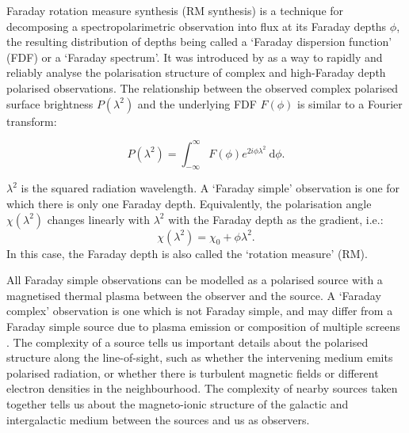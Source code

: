   Faraday rotation measure synthesis (RM synthesis) is a technique for decomposing a spectropolarimetric observation into flux at its Faraday depths $\phi$, the resulting distribution of depths being called a `Faraday dispersion function' (FDF) or a `Faraday spectrum'. It was introduced by \citet{brentjens_faraday_2005} as a way to rapidly and reliably analyse the polarisation structure of complex and high-Faraday depth polarised observations. The relationship between the observed complex polarised surface brightness $P(\lambda^2)$ and the underlying FDF $F(\phi)$ is similar to a Fourier transform:

  \begin{equation}
      \label{eq:faraday-f-to-p}
      P(\lambda^2) = \int_{-\infty}^{\infty} F(\phi) e^{2i\phi\lambda^2}\ \mathrm{d}\phi.
  \end{equation}

  $\lambda^2$ is the squared radiation wavelength. A `Faraday simple' observation is one for which there is only one Faraday depth. Equivalently, the polarisation angle $\chi(\lambda^2)$ changes linearly with $\lambda^2$ with the Faraday depth as the gradient, i.e.:
  \begin{equation}
    \label{eq:faraday-chi}
    \chi(\lambda^2) = \chi_0 + \phi \lambda^2.    
  \end{equation}
  In this case, the Faraday depth is also called the `rotation measure' (RM).

  All Faraday simple observations can be modelled as a polarised source with a magnetised thermal plasma \citep[a `Faraday screen';][]{brentjens_faraday_2005,anderson_broadband_2015} between the observer and the source. A `Faraday complex' observation is one which is not Faraday simple, and may differ from a Faraday simple source due to plasma emission or composition of multiple screens \citep{brentjens_faraday_2005}. The complexity of a source tells us important details about the polarised structure along the line-of-sight, such as whether the intervening medium emits polarised radiation, or whether there is turbulent magnetic fields or different electron densities in the neighbourhood. The complexity of nearby sources taken together tells us about the magneto-ionic structure of the galactic and intergalactic medium between the sources and us as observers.

